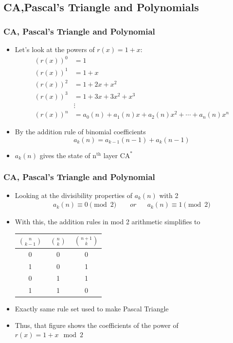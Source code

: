 \documentclass{beamer}
\begin{document}
\subsection{CA,Pascal's Triangle and Polynomials}
\begin{frame}
    \frametitle{CA, Pascal's Triangle and Polynomial}
    \begin{itemize}
        \item Let's look at the powers of $r(x) = 1 + x$:
        \begin{align*}
            (r(x))^{0} &=1 \\
            (r(x))^{1} &=1+x \\
            (r(x))^{2} &=1+2 x+x^{2} \\
            (r(x))^{3} &=1+3 x+3 x^{2}+x^{3} \\ & \vdots \\
            (r(x))^{n} &=a_{0}(n)+a_{1}(n) x+a_{2}(n) x^{2}+\cdots+a_{n}(n) x^{n} 
        \end{align*}
        \item By the addition rule of binomial coefficients
        \begin{equation*}
            a_k(n) = a_{k-1}(n-1) + a_k(n-1)
        \end{equation*}
        \item $a_k(n)$ gives the state of $\text{n}^{\text{th}}$ layer $\text{CA}^*$ 
    \end{itemize}
\end{frame}
    
\begin{frame}
    \frametitle{CA, Pascal's Triangle and Polynomial}
    \begin{itemize}
        \item Looking at the divisibility properties of $a_k(n)$ with 2
        \begin{align*}
            a_k(n) \equiv 0 \pmod 2  \qquad or&& a_k(n) \equiv 1 \pmod 2
        \end{align*}
        \item With this, the addition rules in mod 2 arithmetic simplifies to
        \begin{table}
            \centering
            \begin{tabular}{|c|c|c|}
                \hline
                $\binom{n}{k-1}$& $ \ \binom{n}{k} \ $ & $\binom{n+1}{k}$\\
                \hline
                0 & 0 & 0 \\
                1  & 0 & 1  \\
                0 & 1  & 1  \\
                1  & 1  & 0\\
                \hline
            \end{tabular}
        \end{table}
        \item Exactly same rule set used to make Pascal Triangle
        \item Thus, that figure shows the coefficients of the power of $r(x) = 1+x \mod 2$ 
    \end{itemize}
\end{frame}
\end{document}
